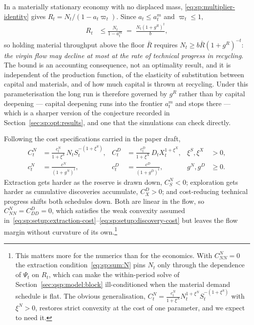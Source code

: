 \begin{remark}\label{rem:qsp:tail}
In a materially stationary economy with no displaced mass, \eqref{eq:sp:multiplier-identity} gives
$R_t=N_t/\left(1-a_t\varpi_t\right)$. Since $a_t\le a^m_t$ and $\varpi_t\le1$,
\begin{align}
R_t &\le \frac{N_t}{1-a^m_t}\;=\;\frac{N_t\left(1+g^R\right)^t}{b},
\label{eq:qsp:tail-bound}
\end{align}
so holding material throughput above the floor $\bar R$ requires
$N_t\ge b\bar R\left(1+g^R\right)^{-t}$: \emph{the virgin flow may decline at most at the rate of
technical progress in recycling}. The bound is an accounting consequence, not an optimality result, and
it is independent of the production function, of the elasticity of substitution between capital and
materials, and of how much capital is thrown at recycling. Under this parameterisation the long run is
therefore governed by $g^R$ rather than by capital deepening --- capital deepening runs into the
frontier $a^m_t$ and stops there --- which is a sharper version of the conjecture recorded in
Section~\ref{sec:sp:opt:results}, and one that the simulations can check directly.
\end{remark}

 Following the cost specifications carried in the paper draft,
\begin{align}
C^N_t &= \frac{c^N_t}{1+\xi^S}\,N_tS_t^{-\left(1+\xi^S\right)},
&
C^D_t &= \frac{c^D_t}{1+\xi^X}\,D_tX_t^{1+\xi^X},
&
\xi^S,\xi^X&>0,
\label{eq:qsp:mining-costs}
\\
c^N_t &= \frac{c^N}{\left(1+g^N\right)^t},
&
c^D_t &= \frac{c^D}{\left(1+g^D\right)^t},
&
g^N,g^D&\ge0 .
\label{eq:qsp:mining-progress}
\end{align}
Extraction gets harder as the reserve is drawn down, $C^N_S<0$; exploration gets harder as cumulative
discoveries accumulate, $C^D_X>0$; and cost-reducing technical progress shifts both schedules down.
Both are linear in the flow, so $C^N_{NN}=C^D_{DD}=0$, which satisfies the weak convexity assumed
in~\eqref{eq:sp:setup:extraction-cost}--\eqref{eq:sp:setup:discovery-cost} but leaves the flow margin
without curvature of its own.\footnote{This matters more for the numerics than for the economics. With
$C^N_{NN}=0$ the extraction condition~\eqref{eq:sp:sum:N} pins $N_t$ only through the dependence of
$\Psi_t$ on $R_t$, which can make the within-period solve of Section~\ref{sec:qsp:model:block}
ill-conditioned when the material demand schedule is flat. The obvious generalisation,
$C^N_t=\frac{c^N_t}{1+\xi^N}N_t^{1+\xi^N}S_t^{-\left(1+\xi^S\right)}$ with $\xi^N>0$, restores strict
convexity at the cost of one parameter, and we expect to need it.}

